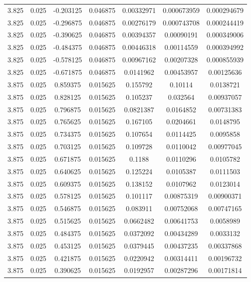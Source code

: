 \begin{flushleft}
\begin{longtable}{ccccccc}
3.825 & 0.025 & -0.203125 & 0.046875 & 0.00332971 & 0.000673959 & 0.000294679  \\ 
3.825 & 0.025 & -0.296875 & 0.046875 & 0.00276179 & 0.000743708 & 0.000244419  \\ 
3.825 & 0.025 & -0.390625 & 0.046875 & 0.00394357 & 0.00090191 & 0.000349006  \\ 
3.825 & 0.025 & -0.484375 & 0.046875 & 0.00446318 & 0.00114559 & 0.000394992  \\ 
3.825 & 0.025 & -0.578125 & 0.046875 & 0.00967162 & 0.00207328 & 0.000855939  \\ 
3.825 & 0.025 & -0.671875 & 0.046875 & 0.0141962 & 0.00453957 & 0.00125636  \\ 
3.875 & 0.025 & 0.859375 & 0.015625 & 0.155792 & 0.10114 & 0.0138721  \\ 
3.875 & 0.025 & 0.828125 & 0.015625 & 0.105237 & 0.032564 & 0.00937057  \\ 
3.875 & 0.025 & 0.796875 & 0.015625 & 0.0821387 & 0.0164852 & 0.00731383  \\ 
3.875 & 0.025 & 0.765625 & 0.015625 & 0.167105 & 0.0204661 & 0.0148795  \\ 
3.875 & 0.025 & 0.734375 & 0.015625 & 0.107654 & 0.0114425 & 0.0095858  \\ 
3.875 & 0.025 & 0.703125 & 0.015625 & 0.109728 & 0.0110042 & 0.00977045  \\ 
3.875 & 0.025 & 0.671875 & 0.015625 & 0.1188 & 0.0110296 & 0.0105782  \\ 
3.875 & 0.025 & 0.640625 & 0.015625 & 0.125224 & 0.0105387 & 0.0111503  \\ 
3.875 & 0.025 & 0.609375 & 0.015625 & 0.138152 & 0.0107962 & 0.0123014  \\ 
3.875 & 0.025 & 0.578125 & 0.015625 & 0.101117 & 0.00875319 & 0.00900371  \\ 
3.875 & 0.025 & 0.546875 & 0.015625 & 0.083911 & 0.00752068 & 0.00747165  \\ 
3.875 & 0.025 & 0.515625 & 0.015625 & 0.0662482 & 0.00641753 & 0.0058989  \\ 
3.875 & 0.025 & 0.484375 & 0.015625 & 0.0372092 & 0.00434289 & 0.0033132  \\ 
3.875 & 0.025 & 0.453125 & 0.015625 & 0.0379445 & 0.00437235 & 0.00337868  \\ 
3.875 & 0.025 & 0.421875 & 0.015625 & 0.0220942 & 0.00314411 & 0.00196732  \\ 
3.875 & 0.025 & 0.390625 & 0.015625 & 0.0192957 & 0.00287296 & 0.00171814  \\ 

\end{longtable}
\end{flushleft}
